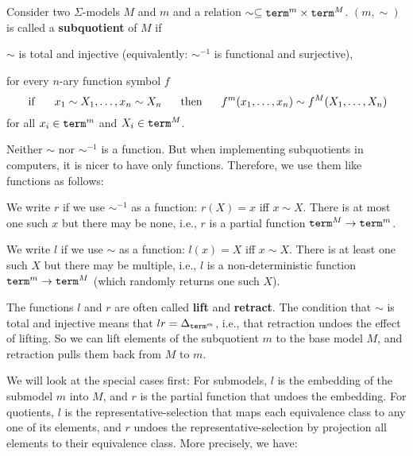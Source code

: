 \begin{definition}[Subquotient]
Consider two $\Sigma$-models $M$ and $m$ and a relation $\sim\subseteq\mathtt{term}^m\times \mathtt{term}^M$.
$(m,\sim)$ is called a \textbf{subquotient} of $M$ if
\begin{compactitem}
\item $\sim$ is total and injective (equivalently: $\sim^{-1}$ is functional and surjective),
\item for every $n$-ary function symbol $f$
  \[\;\mathrm{if}\;\hspace*{.5cm} x_1\sim X_1, \ldots, x_n\sim X_n \hspace*{.5cm}\;\mathrm{then}\;\hspace*{.5cm} f^m(x_1,\ldots,x_n)\sim f^M(X_1,\ldots,X_n)\]
for all $x_i\in\mathtt{term}^m$ and $X_i\in\mathtt{term}^M$.
\end{compactitem}
\end{definition}

Neither $\sim$ nor $\sim^{-1}$ is a function.
But when implementing subquotients in computers, it is nicer to have only functions.
Therefore, we use them like functions as follows:
\begin{compactitem}
 \item We write $r$ if we use $\sim^{-1}$ as a function: $r(X)=x$ iff $x\sim X$. There is at most one such $x$ but there may be none, i.e., $r$ is a partial function $\mathtt{term}^M\to\mathtt{term}^m$.
 \item We write $l$ if we use $\sim$ as a function: $l(x)=X$ iff $x\sim X$. There is at least one such $X$ but there may be multiple, i.e., $l$ is a non-deterministic function $\mathtt{term}^m\to\mathtt{term}^M$ (which randomly returns one such $X$).
\end{compactitem}
The functions $l$ and $r$ are often called \textbf{lift} and \textbf{retract}.
The condition that $\sim$ is total and injective means that $lr=\Delta_{\mathtt{term}^m}$, i.e., that retraction undoes the effect of lifting.
So we can lift elements of the subquotient $m$ to the base model $M$, and retraction pulls them back from $M$ to $m$.

We will look at the special cases first:
For submodels, $l$ is the embedding of the submodel $m$ into $M$, and $r$ is the partial function that undoes the embedding.
For quotients, $l$ is the representative-selection that maps each equivalence class to any one of its elements, and $r$ undoes the representative-selection by projection all elements to their equivalence class.
More precisely, we have:

